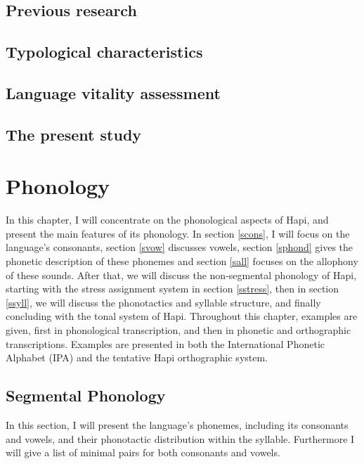 \documentclass[a4paper, 12pt, oneside]{memoir}
\begin{document}
\section{Previous research}\label{sresearch}
\section{Typological characteristics}\label{stypo}
\section{Language vitality assessment}\label{svitality}
\section{The present study}
\chapter{Phonology}
In this chapter, I will concentrate on the phonological aspects of Hapi, and present the main features of its phonology. In section \ref{scons}, I will focus on the language's consonants, section \ref{svow} discusses vowels, section \ref{sphond} gives the phonetic description of these phonemes and section \ref{sall} focuses on the allophony of these sounds. After that, we will discuss the non-segmental phonology of Hapi, starting with the stress assignment system in section \ref{sstress}, then in section \ref{ssyll}, we will discuss the phonotactics and syllable structure, and finally concluding with the tonal system of Hapi.  Throughout this chapter, examples are given, first in phonological transcription, and then in phonetic and orthographic transcriptions. Examples are presented in both the International Phonetic Alphabet (IPA) and the tentative Hapi orthographic system.
\section{Segmental Phonology}
In this section, I will present the language's phonemes, including its consonants and vowels, and their phonotactic distribution within the syllable. Furthermore I will give a list of minimal pairs for both consonants and vowels.
\end{document}
